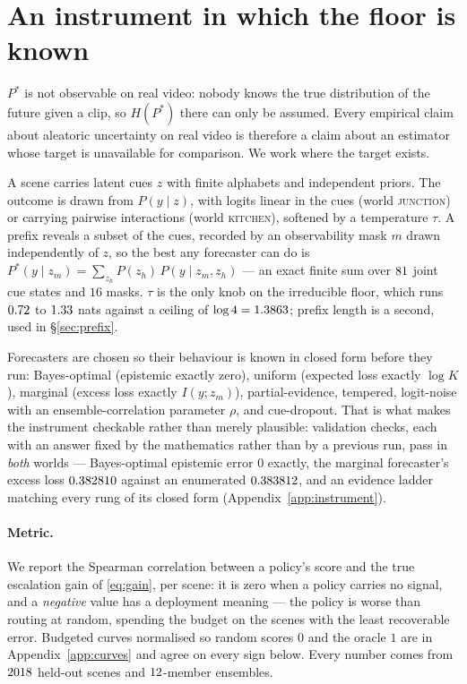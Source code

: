 \documentclass[10pt]{article}
\newcommand{\Pstar}{P^{*}}
\begin{document}
\section{An instrument in which the floor is known}
\label{sec:instrument}

$\Pstar$ is not observable on real video: nobody knows the true distribution of the future given a
clip, so $H(\Pstar)$ there can only be assumed. Every empirical claim about aleatoric uncertainty
on real video is therefore a claim about an estimator whose target is unavailable for comparison.
We work where the target exists.

A scene carries latent cues $z$ with finite alphabets and independent priors. The outcome is drawn
from $P(y\mid z)$, with logits linear in the cues (world \textsc{junction}) or carrying pairwise
interactions (world \textsc{kitchen}), softened by a temperature $\tau$. A prefix reveals a subset
of the cues, recorded by an observability mask $m$ drawn independently of $z$, so the best any
forecaster can do is $\Pstar(y \mid z_m) = \sum_{z_h} P(z_h)\,P(y \mid z_m, z_h)$ --- an exact
finite sum over $81$ joint cue states and $16$ masks. $\tau$ is the only knob on the
irreducible floor, which runs $0.72$ to $1.33$ nats against a ceiling of
$\log 4 = 1.3863$; prefix length is a second, used in \S\ref{sec:prefix}.

Forecasters are chosen so their behaviour is known in closed form before they run: Bayes-optimal
(epistemic exactly zero), uniform (expected loss exactly $\log K$), marginal (excess loss exactly
$I(y; z_m)$), partial-evidence, tempered, logit-noise with an ensemble-correlation parameter
$\rho$, and cue-dropout. That is what makes the instrument checkable rather than merely plausible:
\NumChecks{} validation checks, each with an answer fixed by the mathematics rather than by a
previous run, pass in \emph{both} worlds --- Bayes-optimal epistemic error $0$ exactly, the
marginal forecaster's excess loss $0.382810$ against an enumerated $0.383812$, and an
evidence ladder matching every rung of its closed form (Appendix~\ref{app:instrument}).

\paragraph{Metric.} We report the Spearman correlation between a policy's score and the true
escalation gain of \eqref{eq:gain}, per scene: it is zero when a policy carries no signal, and a
\emph{negative} value has a deployment meaning --- the policy is worse than routing at random,
spending the budget on the scenes with the least recoverable error. Budgeted curves normalised so
random scores $0$ and the oracle $1$ are in Appendix~\ref{app:curves} and agree on every sign
below. Every number comes from $2018$ held-out scenes and $12$-member ensembles.
\end{document}
